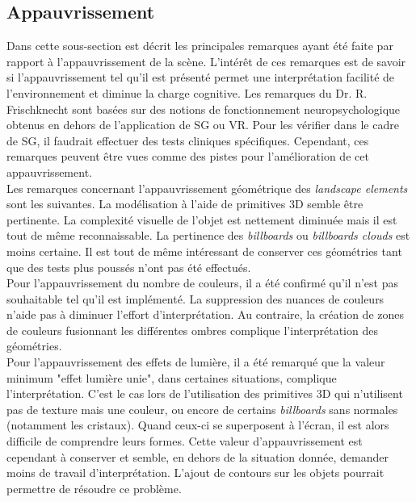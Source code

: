 	\subsection*{Appauvrissement}
		Dans cette sous-section est décrit les principales remarques ayant été faite par rapport à l'appauvrissement de la scène. L'intérêt de ces remarques est de savoir si l'appauvrissement tel qu'il est présenté permet une interprétation facilité de l'environnement et diminue la charge cognitive. Les remarques du Dr. R. Frischknecht sont basées sur des notions de fonctionnement neuropsychologique obtenus en dehors de l’application de SG ou VR. Pour les vérifier dans le cadre de SG, il faudrait effectuer des tests cliniques spécifiques. Cependant, ces remarques peuvent être vues comme des pistes pour l'amélioration de cet appauvrissement.
		\\
		
		Les remarques concernant l'appauvrissement géométrique des \textit{landscape elements} sont les suivantes. La modélisation à l'aide de primitives 3D semble être pertinente. La complexité visuelle de l'objet est nettement diminuée mais il est tout de même reconnaissable. La pertinence des \textit{billboards} ou \textit{billboards clouds} est moins certaine. Il est tout de même intéressant de conserver ces géométries tant que des tests plus poussés n'ont pas été effectués.
		\\
	
		Pour l'appauvrissement du nombre de couleurs, il a été confirmé qu'il n'est pas souhaitable tel qu'il est implémenté. La suppression des nuances de couleurs n'aide pas à diminuer l'effort d'interprétation. Au contraire, la création de zones de couleurs fusionnant les différentes ombres complique l'interprétation des géométries.
		\\
		
		Pour l'appauvrissement des effets de lumière, il a été remarqué que la valeur minimum "effet lumière unie", dans certaines situations, complique l'interprétation. C'est le cas lors de l'utilisation des primitives 3D qui n'utilisent pas de texture mais une couleur, ou encore de certains \textit{billboards} sans normales (notamment les cristaux). Quand ceux-ci se superposent à l'écran, il est alors difficile de comprendre leurs formes. Cette valeur d'appauvrissement est cependant à conserver et semble, en dehors de la situation donnée, demander moins de travail d'interprétation. L'ajout de contours sur les objets pourrait permettre de résoudre ce problème.
		\\
		
